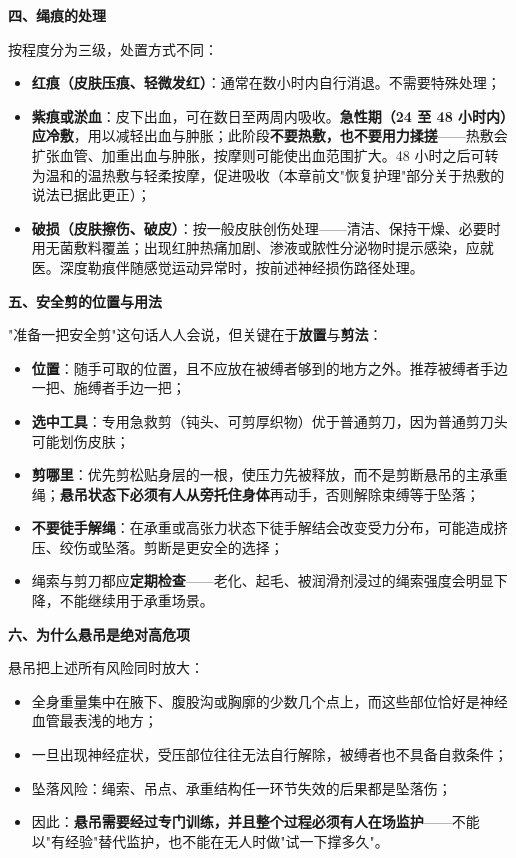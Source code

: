 \textbf{四、绳痕的处理}

按程度分为三级，处置方式不同：

\begin{itemize}
\item \textbf{红痕（皮肤压痕、轻微发红）}：通常在数小时内自行消退。不需要特殊处理；
\item \textbf{紫痕或淤血}：皮下出血，可在数日至两周内吸收。\textbf{急性期（24 至 48 小时内）应冷敷}，用以减轻出血与肿胀；此阶段\textbf{不要热敷，也不要用力揉搓}——热敷会扩张血管、加重出血与肿胀，按摩则可能使出血范围扩大。48 小时之后可转为温和的温热敷与轻柔按摩，促进吸收（本章前文"恢复护理"部分关于热敷的说法已据此更正）；
\item \textbf{破损（皮肤擦伤、破皮）}：按一般皮肤创伤处理——清洁、保持干燥、必要时用无菌敷料覆盖；出现红肿热痛加剧、渗液或脓性分泌物时提示感染，应就医。深度勒痕伴随感觉运动异常时，按前述神经损伤路径处理。
\end{itemize}

\textbf{五、安全剪的位置与用法}

"准备一把安全剪"这句话人人会说，但关键在于\textbf{放置}与\textbf{剪法}：

\begin{itemize}
\item \textbf{位置}：随手可取的位置，且不应放在被缚者够到的地方之外。推荐被缚者手边一把、施缚者手边一把；
\item \textbf{选中工具}：专用急救剪（钝头、可剪厚织物）优于普通剪刀，因为普通剪刀头可能划伤皮肤；
\item \textbf{剪哪里}：优先剪松贴身层的一根，使压力先被释放，而不是剪断悬吊的主承重绳；\textbf{悬吊状态下必须有人从旁托住身体}再动手，否则解除束缚等于坠落；
\item \textbf{不要徒手解绳}：在承重或高张力状态下徒手解结会改变受力分布，可能造成挤压、绞伤或坠落。剪断是更安全的选择；
\item 绳索与剪刀都应\textbf{定期检查}——老化、起毛、被润滑剂浸过的绳索强度会明显下降，不能继续用于承重场景。
\end{itemize}

\textbf{六、为什么悬吊是绝对高危项}

悬吊把上述所有风险同时放大：

\begin{itemize}
\item 全身重量集中在腋下、腹股沟或胸廓的少数几个点上，而这些部位恰好是神经血管最表浅的地方；
\item 一旦出现神经症状，受压部位往往无法自行解除，被缚者也不具备自救条件；
\item 坠落风险：绳索、吊点、承重结构任一环节失效的后果都是坠落伤；
\item 因此：\textbf{悬吊需要经过专门训练，并且整个过程必须有人在场监护}——不能以"有经验"替代监护，也不能在无人时做"试一下撑多久"。
\end{itemize}

